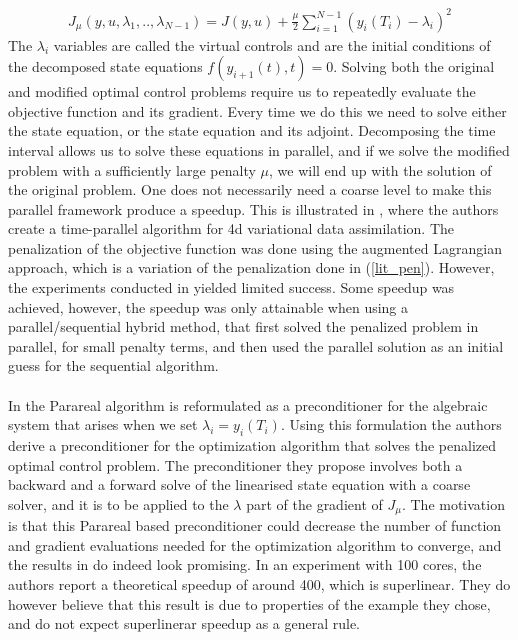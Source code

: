 \begin{align}
J_{\mu}(y,u,\lambda_1,..,\lambda_{N-1})=J(y,u) +\frac{\mu }{2}\sum_{i=1}^{N-1}(y_i(T_i)-\lambda_i)^2 \label{lit_pen}
\end{align} 
The $\lambda_i$ variables are called the virtual controls and are the initial conditions of the decomposed state equations $f(y_{i+1}(t),t)=0$. Solving both the original and modified optimal control problems require us to repeatedly evaluate the objective function and its gradient. Every time we do this we need to solve either the state equation, or the state equation and its adjoint. Decomposing the time interval allows us to solve these equations in parallel, and if we solve the modified problem with a sufficiently large penalty $\mu$, we will end up with the solution of the original problem. One does not necessarily need a coarse level to make this parallel framework produce a speedup. This is illustrated in \cite{rao2016time}, where the authors create a time-parallel algorithm for 4d variational data assimilation. The penalization of the objective function was done using the augmented Lagrangian approach, which is a variation of the penalization done in (\ref{lit_pen}). However, the experiments conducted in \cite{rao2016time} yielded limited success. Some speedup was achieved, however, the speedup was only attainable when using a parallel/sequential hybrid method, that first solved the penalized problem in parallel, for small penalty terms, and then used the parallel solution as an initial guess for the sequential algorithm. 
\\
\\
In \cite{maday2002parareal} the Parareal algorithm is reformulated as a preconditioner for the algebraic system that arises when we set $\lambda_i=y_{i}(T_i)$. Using this formulation the authors derive a preconditioner for the optimization algorithm that solves the penalized optimal control problem. The preconditioner they propose involves both a backward and a forward solve of the linearised state equation with a coarse solver, and it is to be applied to the $\lambda$ part of the gradient of $J_{\mu}$. The motivation is that this Parareal based preconditioner could decrease the number of function and gradient evaluations needed for the optimization algorithm to converge, and the results in \cite{maday2002parareal} do indeed look promising. In an experiment with 100 cores, the authors report a theoretical speedup of around 400, which is superlinear. They do however believe that this result is due to properties of the example they chose, and do not expect superlinerar speedup as a general rule. 
